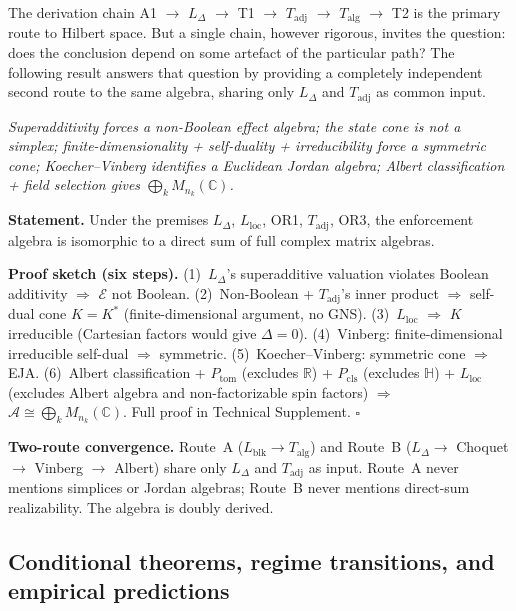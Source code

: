 \documentclass[11pt]{article}
\theoremstyle{remark}
\begin{document}
\noindent The derivation chain A1 $\to$ $L_\Delta$ $\to$ T1 $\to$ $T_{\mathrm{adj}}$ $\to$ $T_{\mathrm{alg}}$ $\to$ T2 is the primary route to Hilbert space.  But a single chain, however rigorous, invites the question: does the conclusion depend on some artefact of the particular path?  The following result answers that question by providing a completely independent second route to the same algebra, sharing only $L_\Delta$ and $T_{\mathrm{adj}}$ as common input.

\begin{tcolorbox}[apfbox, title={Proposition T1-NB (Non-Boolean Bridge)}]
\textit{Superadditivity forces a non-Boolean effect algebra; the state cone is not a simplex; finite-dimensionality + self-duality + irreducibility force a symmetric cone; Koecher--Vinberg identifies a Euclidean Jordan algebra; Albert classification + field selection gives $\bigoplus_k M_{n_k}(\mathbb{C})$.}

\smallskip\noindent\textbf{Statement.}  Under the premises $L_\Delta$, $L_{\mathrm{loc}}$, OR1, $T_{\mathrm{adj}}$, OR3, the enforcement algebra is isomorphic to a direct sum of full complex matrix algebras.

\smallskip\noindent\textbf{Proof sketch (six steps).}  (1)~$L_\Delta$'s superadditive valuation violates Boolean additivity $\Rightarrow$ $\mathcal{E}$ not Boolean.  (2)~Non-Boolean + $T_{\mathrm{adj}}$'s inner product $\Rightarrow$ self-dual cone $K = K^*$ (finite-dimensional argument, no GNS).  (3)~$L_{\mathrm{loc}}$ $\Rightarrow$ $K$ irreducible (Cartesian factors would give $\Delta = 0$).  (4)~Vinberg: finite-dimensional irreducible self-dual $\Rightarrow$ symmetric.  (5)~Koecher--Vinberg: symmetric cone $\Rightarrow$ EJA.  (6)~Albert classification + $P_{\mathrm{tom}}$ (excludes $\mathbb{R}$) + $P_{\mathrm{cls}}$ (excludes $\mathbb{H}$) + $L_{\mathrm{loc}}$ (excludes Albert algebra and non-factorizable spin factors) $\Rightarrow$ $\mathcal{A} \cong \bigoplus_k M_{n_k}(\mathbb{C})$.  Full proof in Technical Supplement.  \hfill$\square$
\end{tcolorbox}

\smallskip\noindent\textbf{Two-route convergence.}  Route~A ($L_{\mathrm{blk}} \to T_{\mathrm{alg}}$) and Route~B ($L_\Delta \to$ Choquet $\to$ Vinberg $\to$ Albert) share only $L_\Delta$ and $T_{\mathrm{adj}}$ as input.  Route~A never mentions simplices or Jordan algebras; Route~B never mentions direct-sum realizability.  The algebra is doubly derived.


\subsection{Conditional theorems, regime transitions, and empirical predictions}
\label{sec:predictions}
\end{document}
